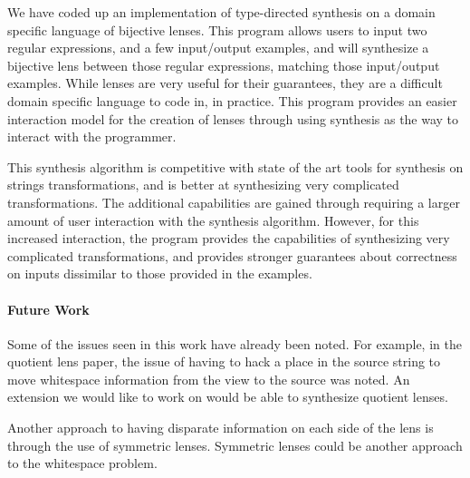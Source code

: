 \documentclass[numbers,10pt,preprint\ifanon ,nocopyrightspace\fi]{sigplanconf}
\begin{document}
We have coded up an implementation of type-directed synthesis on a domain
specific language of bijective lenses.  This program allows users to input two
regular expressions, and a few input/output examples, and will synthesize a
bijective lens between those regular expressions, matching those input/output
examples.  While lenses are very useful for their guarantees, they are a
difficult domain specific language to code in, in practice.  This program
provides an easier interaction model for the creation of lenses through using
synthesis as the way to interact with the programmer.

This synthesis algorithm is competitive with state of the art tools for
synthesis on strings transformations, and is better at synthesizing very
complicated transformations.  The additional capabilities are gained through requiring a
larger amount of user interaction with the synthesis algorithm.  However,
for this increased interaction, the program provides the capabilities of
synthesizing very complicated transformations, and provides stronger guarantees
about correctness on inputs dissimilar to those provided in the examples.

\paragraph*{Future Work}
Some of the issues seen in this work have already been noted.  For example, in the
quotient lens paper, the issue of having to hack a place in the source string to
move whitespace information from the view to the source was noted.  An extension
we would like to work on would be able to synthesize quotient lenses.

Another approach to having disparate information on each side of the lens is
through the use of symmetric lenses.  Symmetric lenses could be another approach to the
whitespace problem.


\appendix

\ifanon\else
\acks 
\fi






\end{document}
